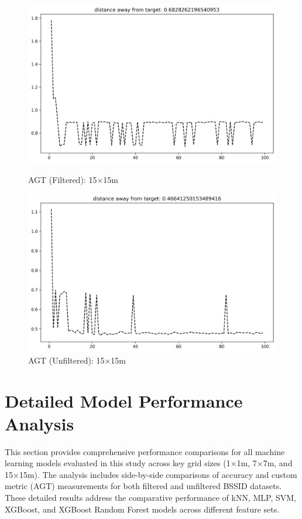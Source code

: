 \documentclass[runningheads]{llncs}
\begin{document}
\begin{figure}[H]
	\centering
	\begin{minipage}{0.49\textwidth}
		\centering
		\includegraphics[width=\textwidth]{figures/filtered/xgbrf_custom_15.png}
		\caption*{AGT (Filtered): 15×15m}
	\end{minipage}
	\hfill
	\begin{minipage}{0.49\textwidth}
		\centering
		\includegraphics[width=\textwidth]{figures/unfiltered/xgbrf_custom_15.png}
		\caption*{AGT (Unfiltered): 15×15m}
	\end{minipage}
\end{figure}

\section{Detailed Model Performance Analysis}

This section provides comprehensive performance comparisons for all machine learning models evaluated in this study across key grid sizes (1×1m, 7×7m, and 15×15m). The analysis includes side-by-side comparisons of accuracy and custom metric (AGT) measurements for both filtered and unfiltered BSSID datasets. These detailed results address the comparative performance of kNN, MLP, SVM, XGBoost, and XGBoost Random Forest models across different feature sets.
\end{document}
